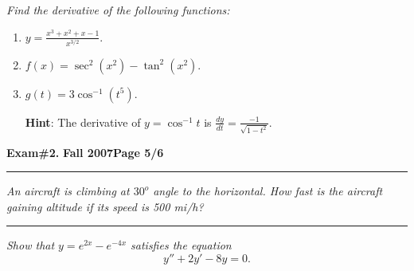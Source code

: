 \documentclass[12pt]{article}
\begin{document}
\bigskip
{\problem[30 pts] \em Find the derivative of the following functions:}
\begin{enumerate}
\item $\displaystyle{y = \frac{x^3 + x^2 + x - 1}{x^{3/2}}}$.
\vspace{4cm}
\begin{flushright}
\end{flushright}
\item $f(x) = \sec^2 (x^2) - \tan^2 (x^2)$.
\vspace{4cm}
\begin{flushright}
\end{flushright}
\item $g(t) = 3\cos^{-1}(t^5)$.

\noindent
{\bf Hint}: The derivative of $y=\cos^{-1}t$ is $\displaystyle{\frac{dy}{dt}} = \frac{-1}{\sqrt{1-t^2}}$.
\vspace{4cm}
\begin{flushright}
\end{flushright}
\end{enumerate}
\newpage

\hfill{\large\bf Exam\#2.}\hfill{\large\bf
  Fall 2007}\hfill{\large\bf Page 5/6}\hrule

\bigskip
{\problem[10 pts] \em An aircraft is climbing at $30^o$ angle to the horizontal.  How fast is the aircraft gaining altitude if its speed is 500 mi/h?}
\vspace{10cm}
\begin{flushright}
\end{flushright}
\hrule
{\problem[10 pts] \em Show that $y=e^{2x} - e^{-4x}$ satisfies the equation}
\begin{equation*}
y'' + 2y' -8y = 0.
\end{equation*}
\newpage
\end{document}
